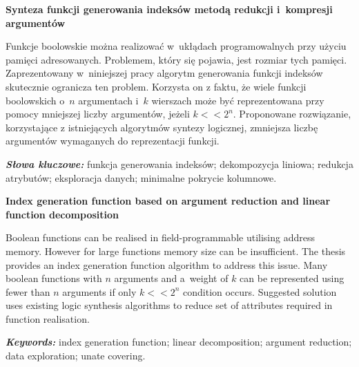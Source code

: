 \newpage
\vspace{10cm}

\newpage
\begin{center}
	\textbf{Synteza funkcji generowania indeksów metodą redukcji i~kompresji argumentów}
\end{center}

Funkcje boolowskie można realizować w~ukłądach programowalnych przy użyciu pamięci adresowanych.
Problemem, który się pojawia, jest rozmiar tych pamięci.
Zaprezentowany w~niniejszej pracy algorytm generowania funkcji indeksów skutecznie ogranicza ten problem.
Korzysta on z faktu,
że wiele funkcji boolowskich o~$n$ argumentach i~$k$ wierszach może być reprezentowana przy pomocy mniejszej liczby argumentów,
jeżeli $k<<2^n$.
Proponowane rozwiązanie,
korzystające z istniejących algorytmów syntezy logicznej,
zmniejsza liczbę argumentów wymaganych do reprezentacji funkcji.

\textit{\textbf{Słowa kluczowe:}} funkcja generowania indeksów; dekompozycja liniowa; redukcja atrybutów; eksploracja danych; minimalne pokrycie kolumnowe.

	\vspace{1cm}

\begin{center}
    \textbf{Index generation function based on argument reduction and linear function decomposition}
\end{center}

Boolean functions can be realised in field-programmable utilising address memory.
However for large functions memory size can be insufficient.
The thesis provides an index generation function algorithm to address this issue.
Many boolean functions with $n$ arguments and a~weight of $k$ can be represented using fewer than $n$ arguments if only $k<<2^n$ condition occurs.
Suggested solution uses existing logic synthesis algorithms to reduce set of attributes required in function realisation.

\textit{\textbf{Keywords:}} index generation function; linear decomposition; argument reduction; data exploration; unate covering.

